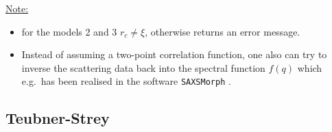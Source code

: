 \vspace{5mm}

\uline{Note:}
\begin{itemize}
\item for the models 2 and 3 $r_c\neq\xi$, otherwise \SASfit returns an error message.
\item Instead of assuming a two-point correlation function, one also can try to inverse the scattering data back into the spectral function $f(q)$ which  e.g.\ has been realised in the software \texttt{SAXSMorph} \cite{Ingham2010}.
\end{itemize}


\newpage
\subsection{Teubner-Strey}
\label{sect:TeubnerStrey}~\\

